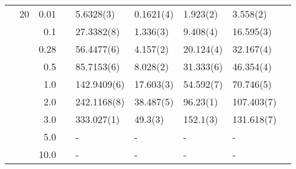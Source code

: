 \begin{table}[H]
\begin{tabularx}{\textwidth}{R{1cm}rrcR{2.3cm}R{2.3cm}R{2.3cm}R{2.3cm}R{1cm}}
		&20 & 0.01 && 5.6328(3) & 0.1621(4) & 1.923(2) & 3.558(2) \\
		&& 0.1 && 27.3382(8) & 1.336(3) & 9.408(4) & 16.595(3) \\
		&& 0.28 && 56.4477(6) & 4.157(2) & 20.124(4) & 32.167(4) \\
		&& 0.5 && 85.7153(6) & 8.028(2) & 31.333(6) & 46.354(4) \\
		&& 1.0 && 142.9409(6) & 17.603(3) & 54.592(7) & 70.746(5) \\
		&& 2.0 && 242.1168(8) & 38.487(5) & 96.23(1) & 107.403(7) \\
		&& 3.0 && 333.027(1) & 49.3(3) & 152.1(3) & 131.618(7) \\ 
		&& 5.0 && - & - & - & -\\
		&& 10.0 && - & - & - & -\\
		\hline \hline
	\end{tabularx}
\end{table}

